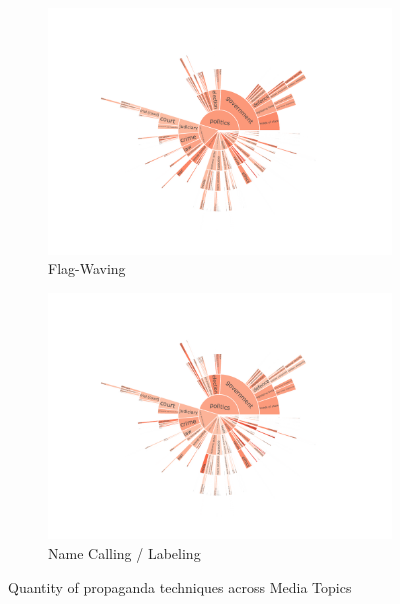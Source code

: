 \begin{figure}[!htbp]
\begin{subfigure}{0.45\textwidth}
		\includegraphics[trim={2.2cm 2cm 2.2cm 2cm},clip,width=\linewidth]{figures/baly_iptc_weighted_prop_tech_Flag-Waving.pdf}
		\caption{Flag-Waving}
            \label{fig:baly_iptc_weighted_prop_tech_Flag-Waving}
	\end{subfigure}
	\begin{subfigure}{0.45\textwidth}
		\includegraphics[trim={2.2cm 2cm 2.2cm 2cm},clip,width=\linewidth]{figures/baly_iptc_weighted_prop_tech_Name_Calling-Labeling.pdf}
		\caption{Name Calling / Labeling}
            \label{fig:baly_iptc_weighted_prop_tech_Name_Calling-Labeling}
	\end{subfigure}
	
    \caption{Quantity of propaganda techniques across Media Topics}
    \label{fig:baly_iptc_weighted_prop_tech}
\end{figure}

